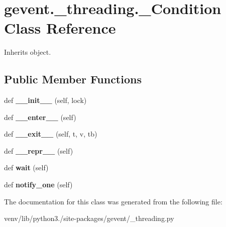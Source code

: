 \hypertarget{classgevent_1_1__threading_1_1___condition}{}\section{gevent.\+\_\+threading.\+\_\+\+Condition Class Reference}
\label{classgevent_1_1__threading_1_1___condition}


Inherits object.

\subsection*{Public Member Functions}
\begin{DoxyCompactItemize}
\item 
\mbox{\label{classgevent_1_1__threading_1_1___condition_aebf2547d244f1d58ef57c482f70b0530}} 
def {\bfseries \+\_\+\+\_\+init\+\_\+\+\_\+} (self, lock)
\item 
\mbox{\label{classgevent_1_1__threading_1_1___condition_aa1396638a2e11b7bfdcabbef0c02880b}} 
def {\bfseries \+\_\+\+\_\+enter\+\_\+\+\_\+} (self)
\item 
\mbox{\label{classgevent_1_1__threading_1_1___condition_a729ca4e0b0f27534796a9bdd40b61f5f}} 
def {\bfseries \+\_\+\+\_\+exit\+\_\+\+\_\+} (self, t, v, tb)
\item 
\mbox{\label{classgevent_1_1__threading_1_1___condition_a86e5c03ebebe5e3ba64c516f27319ae3}} 
def {\bfseries \+\_\+\+\_\+repr\+\_\+\+\_\+} (self)
\item 
\mbox{\label{classgevent_1_1__threading_1_1___condition_a7fb971b6c6549dd8aaec200d2038a983}} 
def {\bfseries wait} (self)
\item 
\mbox{\label{classgevent_1_1__threading_1_1___condition_a244ec76f5f41c6dbdbbe88fa8acb1ad7}} 
def {\bfseries notify\+\_\+one} (self)
\end{DoxyCompactItemize}


The documentation for this class was generated from the following file\+:\begin{DoxyCompactItemize}
\item 
venv/lib/python3./site-\/packages/gevent/\+\_\+threading.\+py\end{DoxyCompactItemize}
